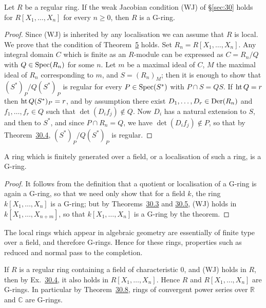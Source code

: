 \begin{theorem}\label{thm:32.6}
Let $R$ be a regular ring. If the weak Jacobian condition (WJ) of \S\ref{sec:30} holds for
$R[X_1, \ldots, X_n]$ for every $n \ge 0$, then $R$ is a G-ring.
\end{theorem}

\begin{proof}
Since (WJ) is inherited by any localisation we can assume that $R$ is local. We
prove that the condition of Theorem~\hyperref[thm:32.5]{5} holds. Set
$R_n = R[X_1, \ldots, X_n]$. Any integral domain $C$ which is finite as an $R$-module
can be expressed as $C = R_n/Q$ with $Q \in \operatorname{Spec}(R_n)$ for some $n$. Let $m$ be a
maximal ideal of $C$, $M$ the maximal ideal of $R_n$ corresponding to $m$, and
$S = (R_n)_M$; then it is enough to show that $(S^*)_P/Q(S^*)_P$ is regular for every
$P \in \operatorname{Spec}(S^*)$ with $P \cap S = QS$. If $\operatorname{ht} Q = r$ then $\operatorname{ht} Q(S^*)_P = r$, and by
assumption there exist $D_1, \ldots, D_r \in \operatorname{Der}(R_n)$ and
$f_1, \ldots, f_r \in Q$ such that $\det(D_if_j) \notin Q$. Now $D_i$ has a natural extension
to $S$, and then to $S^*$, and since $P \cap R_n = Q$, we have
$\det(D_if_j) \notin P$, so that by Theorem~\hyperref[thm:30.4]{30.4}, $(S^*)_P/Q(S^*)_P$ is
regular.
\end{proof}

\begin{corollary*}
A ring which is finitely generated over a field, or a localisation of such a
ring, is a G-ring.
\end{corollary*}

\begin{proof}
It follows from the definition that a quotient or localisation of a G-ring is
again a G-ring, so that we need only show that for a field $k$, the ring
$k[X_1, \ldots, X_n]$ is a G-ring; but by Theorems~\hyperref[thm:30.3]{30.3} and \hyperref[thm:30.5]{30.5}, (WJ)
holds in $k[X_1, \ldots, X_{n+m}]$, so that $k[X_1, \ldots, X_n]$ is a G-ring by the
theorem.
\end{proof}

\begin{remark}
The local rings which appear in algebraic geometry are essentially of finite
type over a field, and therefore G-rings. Hence for these rings, properties such
as reduced and normal pass to the completion.
\end{remark}

\begin{remark}
If $R$ is a regular ring containing a field of characteristic $0$, and (WJ) holds
in $R$, then by Ex.~\hyperref[ex:30.4-ex]{30.4}, it also holds in $R[X_1, \ldots, X_n]$. Hence $R$ and
$R[X_1, \ldots, X_n]$ are G-rings. In particular by Theorem~\hyperref[thm:30.8]{30.8}, rings of
convergent power series over $\mathbb{R}$ and $\mathbb{C}$ are G-rings.
\end{remark}

